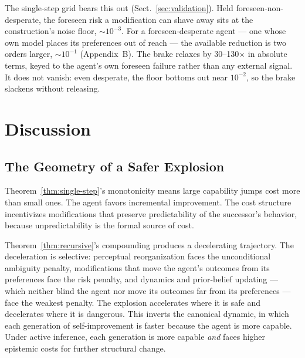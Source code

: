 \documentclass[runningheads]{llncs}
\begin{document}
The single-step grid bears this out (Sect.~\ref{sec:validation}). Held
foreseen-non-desperate, the foreseen risk a modification can shave away sits at
the construction's noise floor, $\sim\!10^{-3}$. For a foreseen-desperate agent
--- one whose own model places its preferences out of reach --- the available
reduction is two orders larger, $\sim\!10^{-1}$ (Appendix~B).
The brake relaxes by 30--130$\times$ in absolute terms, keyed to the agent's
own foreseen failure rather than any external signal. It does not vanish: even
desperate, the floor bottoms out near $10^{-2}$, so the brake slackens without
releasing.

\section{Discussion}

\subsection{The Geometry of a Safer Explosion}

Theorem~\ref{thm:single-step}'s monotonicity means large capability jumps cost more than small ones. The agent favors incremental improvement. The cost structure incentivizes modifications that preserve predictability of the successor's behavior, because unpredictability is the formal source of cost.

Theorem~\ref{thm:recursive}'s compounding produces a decelerating trajectory. The deceleration is selective: perceptual reorganization faces the unconditional ambiguity penalty, modifications that move the agent's outcomes from its preferences face the risk penalty, and dynamics and prior-belief updating --- which neither blind the agent nor move its outcomes far from its preferences --- face the weakest penalty. The explosion accelerates where it is safe and decelerates where it is dangerous. This inverts the canonical dynamic, in which each generation of self-improvement is faster because the agent is more capable. Under active inference, each generation is more capable \textit{and} faces higher epistemic costs for further structural change.
\end{document}
